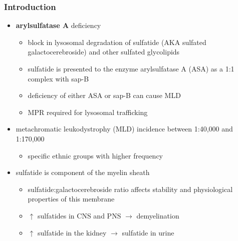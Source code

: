 \documentclass[12pt]{scrartcl}
\begin{document}
\subsubsection{Introduction}
\label{sec:org8e22be2}
\begin{itemize}
\item \textbf{arylsulfatase A} deficiency
\begin{itemize}
\item block in lysosomal degradation of sulfatide (AKA sulfated
galactocerebroside) and other sulfated glycolipids
\item sulfatide is presented to the enzyme arylsulfatase A (ASA) as a
1:1 complex with sap-B
\item deficiency of either ASA or sap-B can cause MLD
\item MPR required for lysosomal trafficking
\end{itemize}
\item metachromatic leukodystrophy (MLD) incidence between 1:40,000 and 1:170,000
\begin{itemize}
\item specific ethnic groups with higher frequency
\end{itemize}

\item sulfatide is component of the myelin sheath
\begin{itemize}
\item sulfatide:galactocerebroside ratio affects stability and
physiological properties of this membrane
\item \(\uparrow\) sulfatides in CNS and PNS \(\to\) demyelination
\item \(\uparrow\) sulfatide in the kidney \(\to\) sulfatide in urine
\end{itemize}
\end{itemize}
\end{document}
